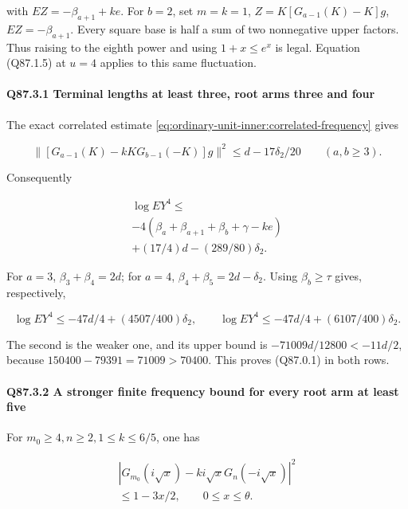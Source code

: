 with \(EZ=\allowbreak -\beta_{a+1}+ke\). For \(b=\allowbreak 2\), set \(m=\allowbreak k=\allowbreak 1\),
\(Z=\allowbreak K[G_{a-1}(K)-K]g\), \(EZ=\allowbreak -\beta_{a+1}\).
Every square base is half a sum of two nonnegative upper factors.
Thus raising to the eighth power and using \(1+x\le\allowbreak  e^x\) is legal.
Equation (Q87.1.5) at \(u=\allowbreak 4\) applies to this same fluctuation.

\paragraph{Q87.3.1 Terminal lengths at least three, root arms three and four}\label{part:Q87.3.1}

The exact correlated estimate \eqref{eq:ordinary-unit-inner:correlated-frequency} gives

\[
 \|[G_{a-1}(K)-kKG_{b-1}(-K)]g\|^2
 \le d-17\delta_2/20\qquad(a,b\ge3).
\]

Consequently

\[
\begin{gathered}
\log EY^4\le\\
-4(\beta_a+\beta_{a+1}+\beta_b+\gamma-ke)\\
+(17/4)d-(289/80)\delta_2.
\end{gathered}\tag{Q87.3.4}\label{eq:Q87:3.4}
\]

For \(a=\allowbreak 3\), \(\beta_3+\beta_4=\allowbreak 2d\); for \(a=\allowbreak 4\),
\(\beta_4+\beta_5=\allowbreak 2d-\delta_2\). Using \(\beta_b\ge\allowbreak \tau\) gives,
respectively,

\[
 \log EY^4\le-47d/4+(4507/400)\delta_2,\qquad
 \log EY^4\le-47d/4+(6107/400)\delta_2.
\]

The second is the weaker one, and its upper bound is
\(-71009d/12800<\allowbreak -11d/2\), because
\(150400-79391=\allowbreak 71009>\allowbreak 70400\). This proves (Q87.0.1) in both rows.

\paragraph{Q87.3.2 A stronger finite frequency bound for every root arm at least five}\label{part:Q87.3.2}

For \(m_0\ge\allowbreak 4,\allowbreak  n\ge\allowbreak 2,\allowbreak  1\le\allowbreak  k\le\allowbreak 6/5\), one has

\[
\begin{gathered}
|G_{m_0}(i\sqrt x)-ki\sqrt xG_n(-i\sqrt x)|^2\\
\le1-3x/2,\qquad0\le x\le\theta.
\end{gathered}\tag{Q87.3.5}\label{eq:Q87:3.5}
\]

